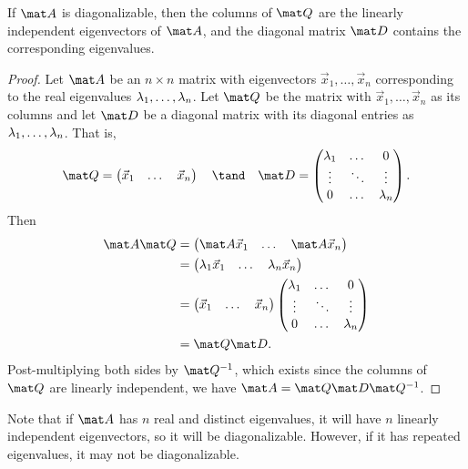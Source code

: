 \begin{proposition}
    If $\mat A$ is diagonalizable, then the columns of $\mat Q$ are the linearly independent eigenvectors of $\mat A$, and the diagonal matrix $\mat D$ contains the corresponding eigenvalues.
\end{proposition}
\begin{proof}
    Let $\mat A$ be an $n \times n$ matrix with eigenvectors $\vec x_1, \dots, \vec x_n$ corresponding to the real eigenvalues $\lambda_1, \dots, \lambda_n$. Let $\mat Q$ be the matrix with $\vec x_1, \dots, \vec x_n$ as its columns and let $\mat D$ be a diagonal matrix with its diagonal entries as $\lambda_1, \dots, \lambda_n$. That is, \[\mat Q = \begin{pmatrix}\vec x_1 & \dots & \vec x_n\end{pmatrix} \quad \tand \quad \mat D = \begin{pmatrix}\l_1 & \dots & 0 \\ \vdots & \ddots & \vdots \\ 0 & \dots & \l_n\end{pmatrix}.\] Then
    \begin{align*}
        \mat A \mat Q &= \begin{pmatrix}\mat A \vec x_1 & \dots & \mat A \vec x_n\end{pmatrix}\\
        &= \begin{pmatrix}\l_1 \vec x_1 & \dots & \l_n \vec x_n\end{pmatrix}\\
        &= \begin{pmatrix}\vec x_1 & \dots & \vec x_n\end{pmatrix} \begin{pmatrix}\l_1 & \dots & 0 \\ \vdots & \ddots & \vdots \\ 0 & \dots & \l_n\end{pmatrix}\\
        &= \mat Q \mat D.
    \end{align*}
    Post-multiplying both sides by $\mat Q^{-1}$, which exists since the columns of $\mat Q$ are linearly independent, we have $\mat A = \mat Q \mat D \mat Q^{-1}$.
\end{proof}

Note that if $\mat A$ has $n$ real and distinct eigenvalues, it will have $n$ linearly independent eigenvectors, so it will be diagonalizable. However, if it has repeated eigenvalues, it may not be diagonalizable.

